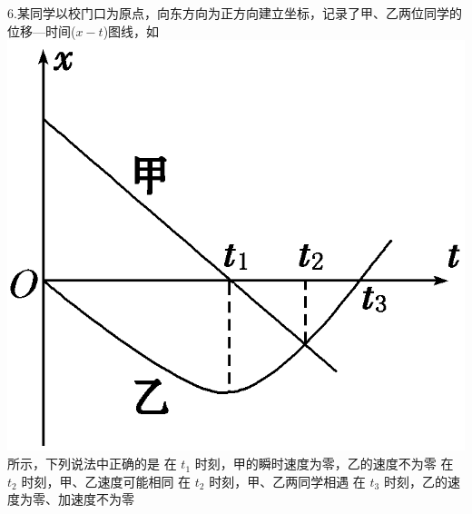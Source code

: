 \documentclass[a4paper,fontset = windows]{ctexbook} %
\begin{document}
\begin{jisuan}
\end{jisuan}

\begin{xuanze}
6.某同学以校门口为原点，向东方向为正方向建立坐标，记录了甲、乙两位同学的位移—时间($x-t$)图线，如
\includegraphics{../picture/1-3/007.png} 
所示，下列说法中正确的是
\choice[A] 在 $t_1$ 时刻，甲的瞬时速度为零，乙的速度不为零
\choice[B] 在 $t_2$ 时刻，甲、乙速度可能相同
\choice[C] 在 $t_2$ 时刻，甲、乙两同学相遇
\choice[D] 在 $t_3$ 时刻，乙的速度为零、加速度不为零

\end{xuanze}
\end{document}
